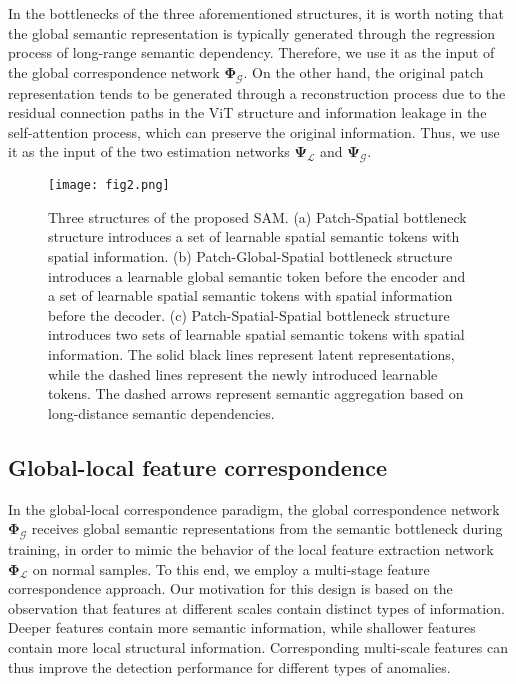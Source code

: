 \documentclass[lettersize,journal]{IEEEtran}
\begin{document}
In the bottlenecks of the three aforementioned structures, it is worth noting that the global semantic representation is typically generated through the regression process of long-range semantic dependency. Therefore, we use it as the input of the global correspondence network $\mathbf{\Phi_{\mathcal{G}}}$. On the other hand, the original patch representation tends to be generated through a reconstruction process due to the residual connection paths in the ViT structure and information leakage in the self-attention process, which can preserve the original information. Thus, we use it as the input of the two estimation networks $\mathbf{\Psi_{\mathcal{L}}}$ and $\mathbf{\Psi_{\mathcal{G}}}$.

\begin{figure*}[t]
\centerline{\texttt{[image: fig2.png]}}
\caption[width=\textwidth]{
Three structures of the proposed SAM. (a) Patch-Spatial bottleneck structure introduces a set of learnable spatial semantic tokens with spatial information. (b) Patch-Global-Spatial bottleneck structure introduces a learnable global semantic token before the encoder and a set of learnable spatial semantic tokens with spatial information before the decoder. (c) Patch-Spatial-Spatial bottleneck structure introduces two sets of learnable spatial semantic tokens with spatial information. The solid black lines represent latent representations, while the dashed lines represent the newly introduced learnable tokens. The dashed arrows represent semantic aggregation based on long-distance semantic dependencies.
}
\label{fig1}
\end{figure*}

\subsection{Global-local feature correspondence}

In the global-local correspondence paradigm, the global correspondence network $\mathbf{\Phi_{\mathcal{G}}}$ receives global semantic representations from the semantic bottleneck during training, in order to mimic the behavior of the local feature extraction network $\mathbf{\Phi_{\mathcal{L}}}$ on normal samples. To this end, we employ a multi-stage feature correspondence approach. Our motivation for this design is based on the observation that features at different scales contain distinct types of information. Deeper features contain more semantic information, while shallower features contain more local structural information. Corresponding multi-scale features can thus improve the detection performance for different types of anomalies.
\end{document}
